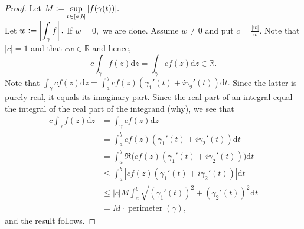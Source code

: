 \estimate*\label{lem:estimate2}
\begin{flushright}\hyperref[lem:estimate]{\upsym}\end{flushright}
\begin{proof}
	Let $M \vcentcolon= \displaystyle\sup_{t \in [a, b]}|f(\gamma(t))|.$\\
	Let $w \vcentcolon= \left|\displaystyle\int_\gamma f\right|.$ If $w = 0,$ we are done. Assume $w \neq 0$ and put $c = \frac{|w|}{w}.$ Note that $|c| = 1$ and that $cw \in \mathbb{R}$ and hence,
	\begin{equation*} 
		c\int_\gamma f(z)\mathrm{d}z = \int_\gamma cf(z)\mathrm{d}z \in \mathbb{R}.
	\end{equation*}
	Note that $\displaystyle\int_\gamma cf(z)\mathrm{d}z = \displaystyle\int_a^b cf(z)(\gamma_1'(t) + i\gamma_2'(t))\mathrm{d}t.$ Since the latter is purely real, it equals its imaginary part. Since the real part of an integral equal the integral of the real part of the integrand (why), we see that
	\begin{align*} 
		c\int_\gamma f(z)\mathrm{d}z &= \int_\gamma cf(z)\mathrm{d}z\\
		&= \int_a^b cf(z)(\gamma_1'(t) + i\gamma_2'(t))\mathrm{d}t\\
		&= \int_a^b \Re \Big(cf(z)(\gamma_1'(t) + i\gamma_2'(t))\Big)\mathrm{d}t\\
		&\le \int_a^b \left|cf(z)(\gamma_1'(t) + i\gamma_2'(t))\right|\mathrm{d}t\\
		&\le |c| M \int_{a}^{b} \sqrt{(\gamma_1'(t))^2 + (\gamma_2'(t))^2} \mathrm{d}t\\
		&= M\cdot\operatorname{perimeter}(\gamma),
	\end{align*}
	and the result follows.
\end{proof}

